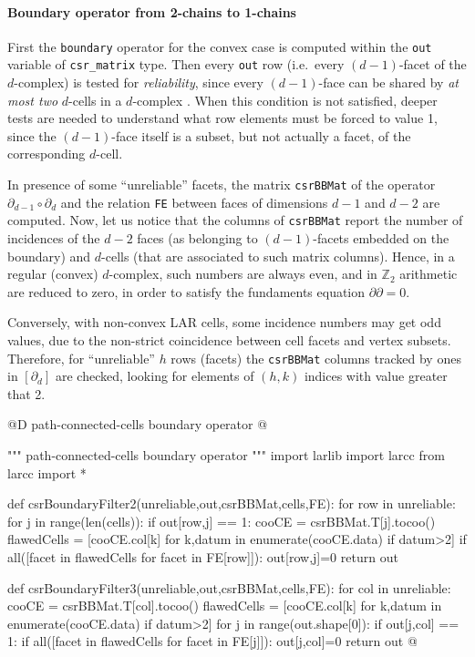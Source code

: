 \documentclass[11pt,oneside]{article}    %
\def\Z{\mathbb{Z}}
\begin{document}
\paragraph{Boundary operator from 2-chains to 1-chains}

First the \texttt{boundary} operator for the convex case is computed within the \texttt{out} variable of \texttt{csr\_matrix} type. Then every \texttt{out} row (i.e.~every $(d-1)$-facet of the $d$-complex) is tested for \emph{reliability}, since every $(d-1)$-face can be shared by \emph{at most two} $d$-cells in a $d$-complex . When this condition is not satisfied, deeper tests are needed to understand what row elements must be forced to value 1, since the $(d-1)$-face itself is a subset, but not actually a facet, of the corresponding $d$-cell. 

In presence of some ``unreliable'' facets, the matrix \texttt{csrBBMat} of the operator $\partial_{d-1}\circ\partial_d$ and the relation \texttt{FE} between faces of dimensions $d-1$ and $d-2$ are computed. Now, let us notice that the columns of \texttt{csrBBMat} report the number of incidences of the $d-2$ faces (as belonging to $(d-1)$-facets embedded on the boundary) and $d$-cells (that are associated to such matrix columns). Hence, in a regular (convex) $d$-complex, such numbers are always even, and in $\Z_2$ arithmetic are reduced to zero, in order to satisfy the fundaments equation $\partial\partial=0$. 

Conversely, with non-convex LAR cells, some incidence numbers may get odd values, due to the non-strict coincidence between cell facets and vertex subsets.
Therefore, for ``unreliable'' $h$ rows (facets) the \texttt{csrBBMat} columns tracked by ones in $[\partial_d]$ are checked, looking for elements of $(h,k)$ indices with value greater that 2.

@D path-connected-cells boundary operator
@{""" path-connected-cells boundary operator """
import larlib
import larcc
from larcc import *

def csrBoundaryFilter2(unreliable,out,csrBBMat,cells,FE):
    for row in unreliable:
        for j in range(len(cells)):
            if out[row,j] == 1:
                cooCE = csrBBMat.T[j].tocoo()
                flawedCells = [cooCE.col[k] for k,datum in enumerate(cooCE.data)
                    if datum>2]
                if all([facet in flawedCells  for facet in FE[row]]):
                    out[row,j]=0
    return out

def csrBoundaryFilter3(unreliable,out,csrBBMat,cells,FE):
    for col in unreliable:
        cooCE = csrBBMat.T[col].tocoo()
        flawedCells = [cooCE.col[k] for k,datum in enumerate(cooCE.data)
                    if datum>2]
        for j in range(out.shape[0]):
            if out[j,col] == 1:
                if all([facet in flawedCells  for facet in FE[j]]):
                    out[j,col]=0
    return out
@}
\end{document}
